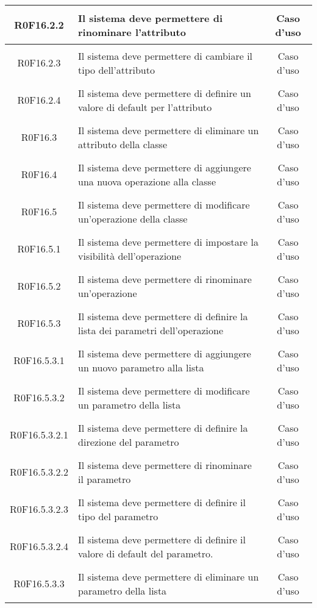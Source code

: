 \documentclass[../AnalisiDeiRequisiti.tex]{subfiles}
\begin{document}
\begin{longtable}{|c|>{\centering}p{7cm}|c|}
	\hypertarget{R0F16.2.2}{R0F16.2.2} & Il sistema deve permettere di rinominare l'attributo & Caso d'uso \\ \hline
	\hypertarget{R0F16.2.3}{R0F16.2.3} & Il sistema deve permettere di cambiare il tipo dell'attributo & Caso d'uso \\ \hline
	\hypertarget{R0F16.2.4}{R0F16.2.4} & Il sistema deve permettere di definire un valore di default per l'attributo & Caso d'uso \\ \hline
	\hypertarget{R0F16.3}{R0F16.3} & Il sistema deve permettere di eliminare un attributo della classe & Caso d'uso \\ \hline
	\hypertarget{R0F16.4}{R0F16.4} & Il sistema deve permettere di aggiungere una nuova operazione alla classe & Caso d'uso \\ \hline
	\hypertarget{R0F16.5}{R0F16.5} & Il sistema deve permettere di modificare un'operazione della classe & Caso d'uso \\ \hline
	\hypertarget{R0F16.5.1}{R0F16.5.1} & Il sistema deve permettere di impostare la visibilità dell'operazione & Caso d'uso \\ \hline
	\hypertarget{R0F16.5.2}{R0F16.5.2} & Il sistema deve permettere di rinominare un'operazione  & Caso d'uso \\ \hline
	\hypertarget{R0F16.5.3}{R0F16.5.3} & Il sistema deve permettere di definire la lista dei parametri dell'operazione & Caso d'uso \\ \hline
	\hypertarget{R0F16.5.3.1}{R0F16.5.3.1} & Il sistema deve permettere di aggiungere un nuovo parametro alla lista & Caso d'uso \\ \hline
	\hypertarget{R0F16.5.3.2}{R0F16.5.3.2} & Il sistema deve permettere di modificare un parametro della lista & Caso d'uso \\ \hline
	\hypertarget{R0F16.5.3.2.1}{R0F16.5.3.2.1} & Il sistema deve permettere di definire la direzione del parametro & Caso d'uso \\ \hline
	\hypertarget{R0F16.5.3.2.2}{R0F16.5.3.2.2} & Il sistema deve permettere di rinominare il parametro & Caso d'uso \\ \hline
	\hypertarget{R0F16.5.3.2.3}{R0F16.5.3.2.3} & Il sistema deve permettere di definire il tipo del parametro & Caso d'uso \\ \hline
	\hypertarget{R0F16.5.3.2.4}{R0F16.5.3.2.4} & Il sistema deve permettere di definire il valore di default del parametro.  & Caso d'uso \\ \hline
	\hypertarget{R0F16.5.3.3}{R0F16.5.3.3} & Il sistema deve permettere di eliminare un parametro della lista & Caso d'uso \\ \hline

\end{longtable}
\end{document}
